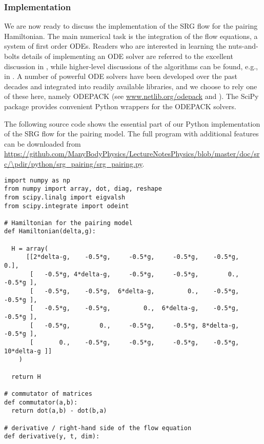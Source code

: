 {\subsubsection{\label{sec:srg_pairing_implementation}Implementation}
We are now ready to discuss the implementation of the SRG flow for the pairing
Hamiltonian. The main numerical task is the integration of the flow equations,
a system of first order ODEs. Readers who are interested in learning the 
nuts-and-bolts details of implementing an ODE solver are referred to the excellent 
discussion in \cite{Press:2007vn}, while higher-level discussions of the algorithms
can be found, e.g., in \cite{Shampine:1975qq,Landau:2012zr,Hjorth-Jensen:2015mz}.
A number of powerful ODE solvers have been developed over the past decades and 
integrated into readily available libraries, and we choose to rely one of these 
here, namely ODEPACK (see \url{www.netlib.org/odepack} and 
\cite{Hindmarsh:1983pd,Radhakrishnan:1993fk,Brown:1989qd}). The SciPy package
provides convenient Python wrappers for the ODEPACK solvers.

The following source code shows the essential part of our Python implementation of
the SRG flow for the pairing model. The full program with additional features can 
be downloaded from 
\url{https://github.com/ManyBodyPhysics/LectureNotesPhysics/blob/master/doc/src/\pdir/python/srg_pairing/srg_pairing.py}.


\begin{lstlisting}
import numpy as np
from numpy import array, dot, diag, reshape
from scipy.linalg import eigvalsh
from scipy.integrate import odeint

# Hamiltonian for the pairing model
def Hamiltonian(delta,g):

  H = array(
      [[2*delta-g,    -0.5*g,     -0.5*g,     -0.5*g,    -0.5*g,          0.],
       [   -0.5*g, 4*delta-g,     -0.5*g,     -0.5*g,        0.,     -0.5*g ], 
       [   -0.5*g,    -0.5*g,  6*delta-g,         0.,    -0.5*g,     -0.5*g ], 
       [   -0.5*g,    -0.5*g,         0.,  6*delta-g,    -0.5*g,     -0.5*g ], 
       [   -0.5*g,        0.,     -0.5*g,     -0.5*g, 8*delta-g,     -0.5*g ], 
       [       0.,    -0.5*g,     -0.5*g,     -0.5*g,    -0.5*g, 10*delta-g ]]
    )

  return H

# commutator of matrices
def commutator(a,b):
  return dot(a,b) - dot(b,a)

# derivative / right-hand side of the flow equation
def derivative(y, t, dim):


\end{lstlisting}}
